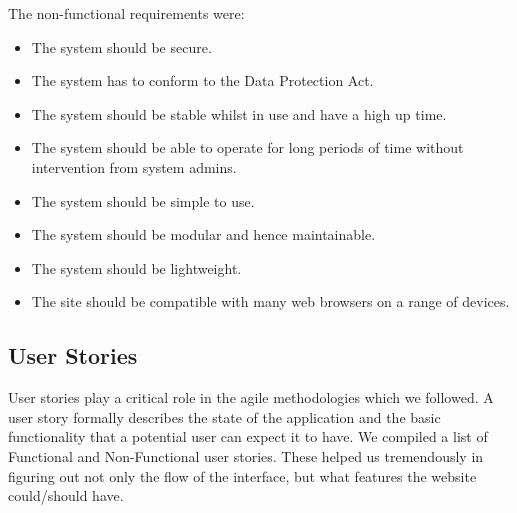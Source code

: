 \documentclass{l3proj}
\begin{document}
The non-functional requirements were:
\begin{itemize}
\item The system should be secure.
\item The system has to conform to the Data Protection Act.
\item The system should be stable whilst in use and have a high up time.
\item The system should be able to operate for long periods of time without intervention from system admins.
\item The system should be simple to use.
\item The system should be modular and hence maintainable.
\item The system should be lightweight.
\item The site should be compatible with many web browsers on a range of devices.

\end{itemize}

\subsection{User Stories}
\label{user_stories}

User stories \cite{user-story} play a critical role in the agile methodologies which we followed. A user story formally describes the state of the application and the basic functionality that a potential user can expect it to have. We compiled a list of Functional and Non-Functional user stories. These helped us tremendously in figuring out not only the flow of the interface, but what features the website could/should have.
\end{document}
